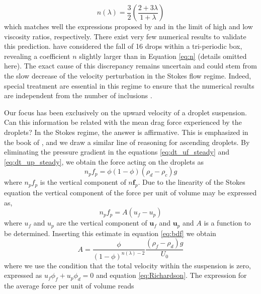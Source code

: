 

\begin{equation}
n(\lambda) = \frac{3}{2}\left(\frac{2+3\lambda}{1+\lambda}\right)
\label{eq:n}
\end{equation} 
which matches well the expressions proposed by \citet{brzinski2018} and \citet{ishii1979drag} in the limit of high and low viscosity ratios, respectively. There exist very few numerical results to validate this prediction. \citet{mo1994} have considered the fall of 16 drops within a tri-periodic box, revealing a coefficient $n$ slightly larger than in Equation \ref{eq:n} (details omitted here). The exact cause of this discrepancy remains uncertain and could stem from the slow decrease of the velocity perturbation in the Stokes flow regime. Indeed, special treatment are essential in this regime to ensure that the numerical results are independent from the number of inclusions \citet{mo1994}.

Our focus has been exclusively on the upward velocity of a droplet suspension. Can this information be related with the mean drag force experienced by the droplets? In the Stokes regime, the answer is affirmative. This is emphasized in the book of \citep{jackson2000}, and we draw a similar line of reasoning for ascending droplets. By eliminating the pressure gradient in the equations \ref{eq:dt_uf_steady} and \ref{eq:dt_up_steady}, we obtain the force acting on the droplets as
\begin{equation}
n_pf_p = \phi(1-\phi)(\rho_d -\rho _c)g
\label{eq:bdf}
\end{equation}
where $n_pf_p$ is the vertical component of $n\textbf{f}_p$. 
Due to the linearity of the Stokes equation the vertical component of the force per unit of volume may be expressed as, 
\begin{equation}
    n_pf_p = A (u_f -u_p)
    \label{eq:stokes}
\end{equation}
where $u_f$ and $u_p$ are the vertical component of $\textbf{u}_f$ and $\textbf{u}_p$ and $A$ is a function to be determined. 
Inserting this estimate in equation \ref{eq:bdf} we obtain 
\begin{equation}
A = \frac{\phi}{(1-\phi)^{n(\lambda)-2}} \frac{(\rho_f -\rho_d)g}{U_0} 
\end{equation}
where we use the condition that the total velocity within the suspension is zero, expressed as $u_f \phi_f + u_p \phi_d =0$ and equation \ref{eq:Richardson}. The expression for the average force per unit of volume reads %


